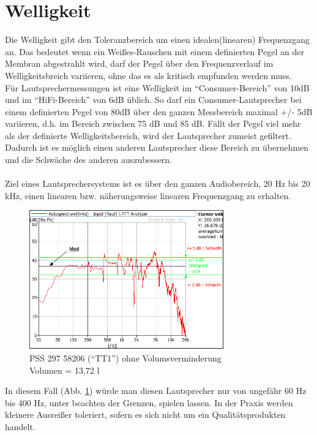 \section{Welligkeit} \label{sec:8.6}
Die Welligkeit gibt den Toleranzbereich um einen idealen(linearen) Frequenzgang an.
Das bedeutet wenn ein Weißes-Rauschen mit einem definierten Pegel an der Membran abgestrahlt wird, darf der Pegel über den Frequenzverlauf im Welligkeitsbreich variieren, ohne das es als kritisch empfunden werden muss. \\
Für Lautsprechermessungen ist eine Welligkeit im \enquote{Consumer-Bereich} von 10dB und im \enquote{HiFi-Bereich} von 6dB üblich.
So darf ein Consumer-Lautsprecher bei einem definierten Pegel von 80dB über den ganzen Messbereich maximal +/- 5dB variieren, d.h. im Bereich zwischen 75 dB und 85 dB.
Fällt der Pegel viel mehr als der definierte Welligkeitsbereich, wird der Lautsprecher zumeist gefiltert.
Dadurch ist es möglich einen anderen Lautsprecher diese Bereich zu übernehmen und die Schwäche des anderen auszubessern.\\ \\
Ziel eines Lautsprechersystems ist es über den ganzen Audiobereich, 20 Hz bis 20 kHz, einen linearen bzw. näherungsweise linearen Frequenzgang zu erhalten.

\begin{figure} [H]
	\centering
	\includegraphics[width=0.75\textwidth]{img/Optimierung/TT/TT1_ohneAllem_welligkeit.png}
	\caption{PSS 297 58206 (\enquote{TT1}) ohne Volumsverminderung \\Volumen = 13,72 l}
	\label{fig:8.6.1}
\end{figure}

In diesem Fall (Abb. \ref{fig:8.6.1}) würde man diesen Lautsprecher nur von ungefähr 60 Hz bis 400 Hz, unter beachten der Grenzen, spielen lassen.
In der Praxis werden kleinere Ausreißer toleriert, sofern es sich nicht um ein Qualitätsprodukten handelt.


